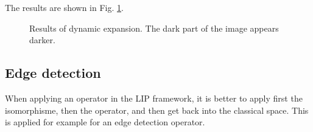 The results are shown in Fig. \ref{fig:lip:results}.
\begin{figure}[htbp]
 \centering
 \hspace{.5cm}
 \hspace{.5cm}
 \caption{Results of dynamic expansion. The dark part of the image appears darker.} \label{fig:lip:results}
\end{figure}

\subsection{Edge detection}
When applying an operator in the LIP framework, it is better to apply first the isomorphisme, then the operator, and then get back into the classical space. This is applied for example for an edge detection operator.

